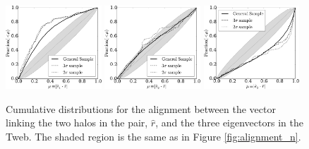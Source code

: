 \documentclass{emulateapj}
\begin{document}
\begin{figure}
\begin{center}
  \includegraphics[width=0.32\textwidth]{fig4a.pdf}
  \includegraphics[width=0.32\textwidth]{fig4b.pdf}
  \includegraphics[width=0.32\textwidth]{fig4c.pdf}
\end{center}
\caption{Cumulative distributions for the alignment between the vector
  linking the two halos in the pair, $\hat{r}$, and the three
  eigenvectors in the Tweb. The shaded region is the same as in
  Figure \ref{fig:alignment_n}.
    \label{fig:alignment_r}}  
\end{figure}
\end{document}
